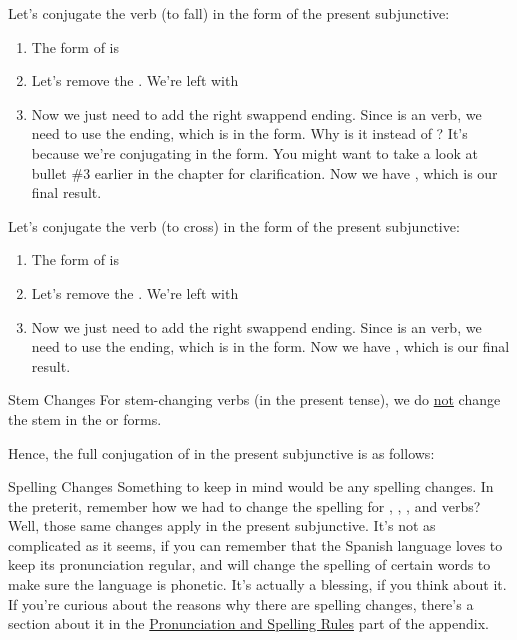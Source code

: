 Let's conjugate the verb  (to fall) in the  form of the present subjunctive:
\begin{enumerate}[noitemsep]
	\item The  form of  is 
	\item Let's remove the . We're left with 
	\item Now we just need to add the right swappend ending. Since  is an  verb, we need to use the  ending, which is  in the  form. Why is it  instead of ? It's because we're conjugating in the  form. You might want to take a look at bullet \#3 earlier in the chapter for clarification. Now we have , which is our final result. 
\end{enumerate}

Let's conjugate the verb  (to cross) in the  form of the present subjunctive:
\begin{enumerate}[noitemsep]
	\item The  form of  is 
	\item Let's remove the . We're left with 
	\item Now we just need to add the right swappend ending. Since  is an  verb, we need to use the  ending, which is  in the  form. Now we have , which is our final result. 
\end{enumerate}

\begin{conf}{Stem Changes}
	For stem-changing verbs (in the present tense), we do \underline{not} change the stem in the  or  forms. 
\end{conf}

Hence, the full conjugation of  in the present subjunctive is as follows: 

\begin{conf}{Spelling Changes}
Something to keep in mind would be any spelling changes. In the preterit, remember how we had to change the spelling for , , , and  verbs? Well, those same changes apply in the present subjunctive. It's not as complicated as it seems, if you can remember that the Spanish language loves to keep its pronunciation regular, and will change the spelling of certain words to make sure the language is phonetic. It's actually a blessing, if you think about it. If you're curious about the reasons why there are spelling changes, there's a section about it in the \hyperref[subsec:pronun]{Pronunciation and Spelling Rules} part of the appendix. 
\end{conf}

